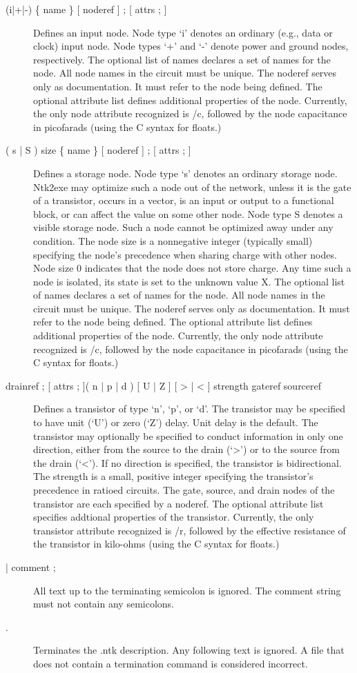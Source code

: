 \begin{description}
\item[{(i|+|-) \{ name \} [ noderef ] ; [ attrs ; ]}]
Defines an input node.  Node type `i' denotes an ordinary
(e.g., data or clock) input node.  Node types `+'
and `-' denote power and ground nodes, respectively.
The optional list of names declares a set of names for
the node.  All node names in the circuit must be
unique.  The noderef serves only as documentation.  It
must refer to the node being defined.  The optional
attribute list defines additional properties of the
node.  Currently, the only node attribute recognized is
/c, followed by the node capacitance in picofarads
(using the C syntax for floats.)


\item[{( s | S ) size \{ name \} [ noderef ] ; [ attrs ; ]}]
Defines a storage node.  Node type `s' denotes an ordinary
storage node.  Ntk2exe may optimize such a node
out of the network, unless it is the gate of a transistor,
occurs in a vector, is an input or output to a
functional block, or can affect the value on some other
node.  Node type S denotes a visible storage node.
Such a node cannot be optimized away under any condition. 
The node size is a nonnegative integer (typically small) specifying the
node's precedence when
sharing charge with other nodes.  Node size 0 indicates
that the node does not store charge.  Any time such a
node is isolated, its state is set to the unknown value
X.  The optional list of names declares a set of names
for the node.  All node names in the circuit must be
unique.  The noderef serves only as documentation.  It
must refer to the node being defined.  The optional
attribute list defines additional properties of the
node.  Currently, the only node attribute recognized is
/c, followed by the node capacitance in picofarads
(using the C syntax for floats.)

\item[{drainref ; [ attrs ; ]( n | p | d ) [ U | Z ] [ > | < ] strength gateref sourceref}]
Defines a transistor of type `n', `p', or `d'.  The
transistor may be specified to have unit (`U') or zero
(`Z') delay.  Unit delay is the default.  The transistor
may optionally be specified to conduct information
in only one direction, either from the source to the
drain (`>') or to the source from the drain (`<').  If
no direction is specified, the transistor is bidirectional. 
The strength is a small, positive integer
specifying the transistor's precedence in ratioed circuits. 
The gate, source, and drain nodes of the
transistor are each specified by a noderef.  The
optional attribute list specifies addtional properties
of the transistor.  Currently, the only transistor
attribute recognized is /r, followed by the effective
resistance of the transistor in kilo-ohms (using the C
syntax for floats.)


\item[|  comment ;]
All text up to the terminating semicolon is ignored.
The comment string must not contain any semicolons.


\item[.]
Terminates the .ntk description.  Any following text is
ignored.  A file that does not contain a termination
command is considered incorrect.


\end{description}

